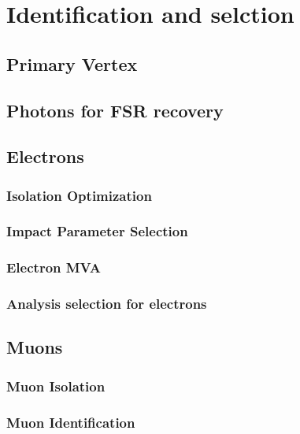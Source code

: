 \section{Identification and selction}
\subsection{Primary Vertex}


\subsection{Photons for FSR recovery}
\label{sec:FSRphotons}


\subsection{Electrons}
\subsubsection{Isolation Optimization}
\label{sec:eleiso}

\subsubsection{Impact Parameter Selection}
\label{sec:eleSIP}

\subsubsection{Electron MVA}
\label{sec:eleMVA}

\subsubsection{Analysis selection for electrons}%
\label{sec:ele_selection}


\subsection{Muons}
\subsubsection{Muon Isolation}
\label{sec:muoniso}

\subsubsection{Muon Identification}


